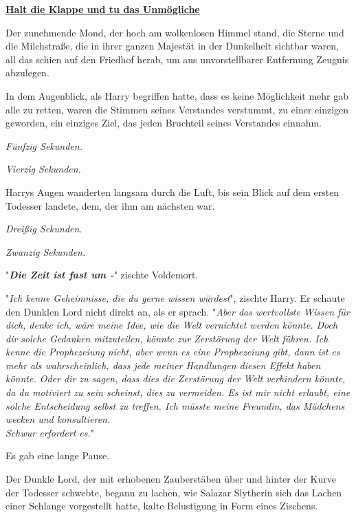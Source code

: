 

\hypertarget{halt-die-klappe-und-tu-das-unmuxf6gliche}{%

\textbf{\uline{Halt die Klappe und tu das Unmögliche}}

Der zunehmende Mond, der hoch am wolkenlosen Himmel stand, die Sterne und die Milchstraße, die in ihrer ganzen Majestät in der Dunkelheit sichtbar waren, all das schien auf den Friedhof herab, um aus unvorstellbarer Entfernung Zeugnis abzulegen.

In dem Augenblick, als Harry begriffen hatte, dass es keine Möglichkeit mehr gab alle zu retten, waren die Stimmen seines Verstandes verstummt, zu einer einzigen geworden, ein einziges Ziel, das jeden Bruchteil seines Verstandes einnahm.

\emph{Fünfzig Sekunden.}

\emph{Vierzig Sekunden.}

Harrys Augen wanderten langsam durch die Luft, bis sein Blick auf dem ersten Todesser landete, dem, der ihm am nächsten war.

\emph{Dreißig Sekunden.}

\emph{Zwanzig Sekunden.}

"\textbf{\emph{Die Zeit ist fast um -}}" zischte Voldemort.

"\emph{Ich kenne Geheimnisse, die du gerne wissen würdest}", zischte Harry. Er schaute den Dunklen Lord nicht direkt an, als er sprach. "\emph{Aber das wertvollste Wissen für dich, denke ich, wäre meine Idee, wie die Welt vernichtet werden könnte. Doch dir solche Gedanken mitzuteilen, könnte zur Zerstörung der Welt führen. Ich kenne die Prophezeiung nicht, aber wenn es eine Prophezeiung gibt, dann ist es mehr als wahrscheinlich, dass jede meiner Handlungen diesen Effekt haben könnte. Oder dir zu sagen, dass dies die Zerstörung der Welt verhindern könnte, da du motiviert zu sein scheinst, dies zu vermeiden. Es ist mir nicht erlaubt, eine solche Entscheidung selbst zu treffen. Ich müsste meine Freundin, das Mädchens wecken und konsultieren.\\ Schwur erfordert es.}"

Es gab eine lange Pause.

Der Dunkle Lord, der mit erhobenen Zauberstäben über und hinter der Kurve der Todesser schwebte, begann zu lachen, wie Salazar Slytherin sich das Lachen einer Schlange vorgestellt hatte, kalte Belustigung in Form eines Zischens.

}
